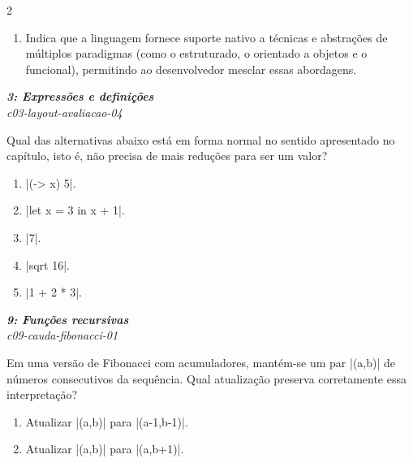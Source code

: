 \documentclass[a4paper,10pt,brazil]{article}
\begin{document}
\begin{multicols}{2}
\begin{enumerate}
  \item Indica que a linguagem fornece suporte nativo a técnicas e abstrações de múltiplos paradigmas (como o estruturado, o orientado a objetos e o funcional), permitindo ao desenvolvedor mesclar essas abordagens.


\end{enumerate}

\begin{flushright}
  \footnotesize
  \textit{\textbf{3: Expressões e definições}}\\
  \textit{c03-layout-avaliacao-04}\\

\end{flushright}
Qual das alternativas abaixo está em forma normal no sentido apresentado no capítulo, isto é, não precisa de mais reduções para ser um valor?

\begin{enumerate}
  \item \haskellinline|(\x -> x) 5|.

  \item \haskellinline|let x = 3 in x + 1|.

  \item \haskellinline|7|.

  \item \haskellinline|sqrt 16|.

  \item \haskellinline|1 + 2 * 3|.


\end{enumerate}

\begin{flushright}
  \footnotesize
  \textit{\textbf{9: Funções recursivas}}\\
  \textit{c09-cauda-fibonacci-01}\\

\end{flushright}
Em uma versão de Fibonacci com acumuladores, mantém-se um par \haskellinline|(a,b)| de números consecutivos da sequência. Qual atualização preserva corretamente essa interpretação?

\begin{enumerate}
  \item Atualizar \haskellinline|(a,b)| para \haskellinline|(a-1,b-1)|.

  \item Atualizar \haskellinline|(a,b)| para \haskellinline|(a,b+1)|.


\end{enumerate}
\end{multicols}
\end{document}
